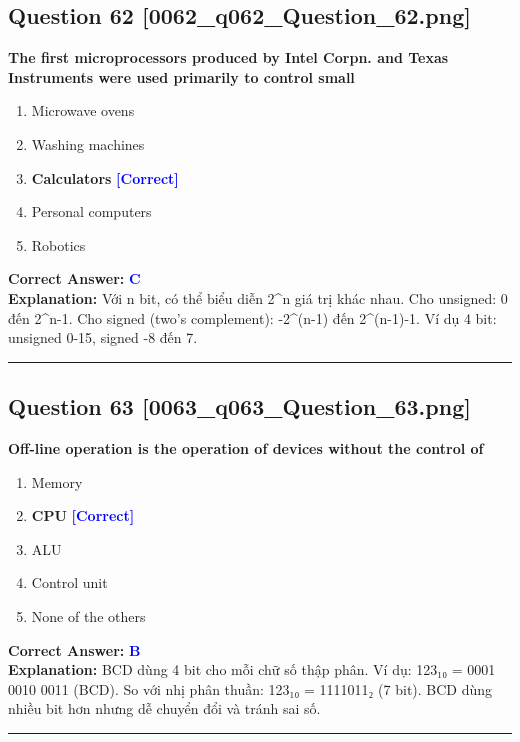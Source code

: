 \documentclass[11pt,a4paper]{article}
\begin{document}
\begin{minipage}{\textwidth}
\subsection*{Question 62 \quad \footnotesize{[0062\_q062\_Question\_62.png]}}
\noindent \textbf{The first microprocessors produced by Intel Corpn. and Texas Instruments were used primarily to control small}

\begin{enumerate}[label=\Alph*.]
    \item Microwave ovens
    \item Washing machines
    \item \textbf{Calculators} \hfill \textcolor{blue}{\textbf{[Correct]}}
    \item Personal computers
    \item Robotics
\end{enumerate}

\noindent \textbf{Correct Answer:} \textcolor{blue}{\textbf{C}} \\[2pt]
\noindent \textbf{Explanation:} Với n bit, có thể biểu diễn 2\textasciicircum{}n giá trị khác nhau. Cho unsigned: 0 đến 2\textasciicircum{}n-1. Cho signed (two's complement): -2\textasciicircum{}(n-1) đến 2\textasciicircum{}(n-1)-1. Ví dụ 4 bit: unsigned 0-15, signed -8 đến 7.

\par\vspace{0.3cm}
\hrule
\vspace{0.3cm}
\end{minipage}

\begin{minipage}{\textwidth}
\subsection*{Question 63 \quad \footnotesize{[0063\_q063\_Question\_63.png]}}
\noindent \textbf{Off-line operation is the operation of devices without the control of}

\begin{enumerate}[label=\Alph*.]
    \item Memory
    \item \textbf{CPU} \hfill \textcolor{blue}{\textbf{[Correct]}}
    \item ALU
    \item Control unit
    \item None of the others
\end{enumerate}

\noindent \textbf{Correct Answer:} \textcolor{blue}{\textbf{B}} \\[2pt]
\noindent \textbf{Explanation:} BCD dùng 4 bit cho mỗi chữ số thập phân. Ví dụ: 123₁₀ = 0001 0010 0011 (BCD). So với nhị phân thuần: 123₁₀ = 1111011₂ (7 bit). BCD dùng nhiều bit hơn nhưng dễ chuyển đổi và tránh sai số.

\par\vspace{0.3cm}
\hrule
\vspace{0.3cm}
\end{minipage}
\end{document}
